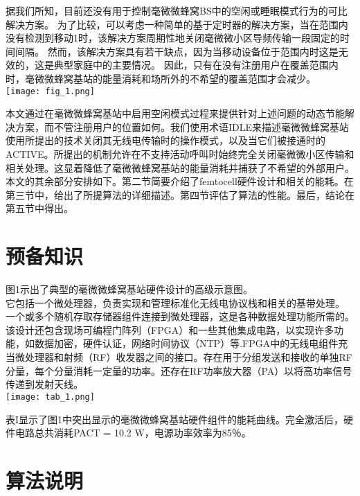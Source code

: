 \documentclass{article}
\begin{document}
据我们所知，目前还没有用于控制毫微微蜂窝BS中的空闲或睡眠模式行为的可比解决方案。
为了比较，可以考虑一种简单的基于定时器的解决方案，当在范围内没有检测到移动1时，该解决方案周期性地关闭毫微微小区导频传输一段固定的时间间隔。
然而，该解决方案具有若干缺点，因为当移动设备位于范围内时这是无效的，这是典型家庭中的主要情况。
因此，只有在没有注册用户在覆盖范围内时，毫微微蜂窝基站的能量消耗和场所外的不希望的覆盖范围才会减少。\\

\texttt{[image: fig\_1.png]}

本文通过在毫微微蜂窝基站中启用空闲模式过程来提供针对上述问题的动态节能解决方案，而不管注册用户的位置如何。我们使用术语IDLE来描述毫微微蜂窝基站使用所提出的技术关闭其无线电传输时的操作模式，以及当它们被接通时的ACTIVE。所提出的机制允许在不支持活动呼叫时始终完全关闭毫微微小区传输和相关处理。这显着降低了毫微微蜂窝基站的能量消耗并捕获了不希望的外部用户。\\

本文的其余部分安排如下。第二节简要介绍了femtocell硬件设计和相关的能耗。在第三节中，给出了所提算法的详细描述。第四节评估了算法的性能。最后，结论在第五节中得出。\\

\section{预备知识}

图1示出了典型的毫微微蜂窝基站硬件设计的高级示意图。\\

它包括一个微处理器，负责实现和管理标准化无线电协议栈和相关的基带处理。
一个或多个随机存取存储器组件连接到微处理器，这是各种数据处理功能所需的。
该设计还包含现场可编程门阵列（FPGA）和一些其他集成电路，以实现许多功能，如数据加密，硬件认证，网络时间协议（NTP）等.FPGA中的无线电组件充当微处理器和射频（RF）收发器之间的接口。存在用于分组发送和接收的单独RF分量，每个分量消耗一定量的功率。还存在RF功率放大器（PA）以将高功率信号传递到发射天线。\\

\texttt{[image: tab\_1.png]}

表I显示了图1中突出显示的毫微微蜂窝基站硬件组件的能耗曲线。完全激活后，硬件电路总共消耗PACT = 10.2 W，电源功率效率为85％。\\

\section{算法说明}
\end{document}
